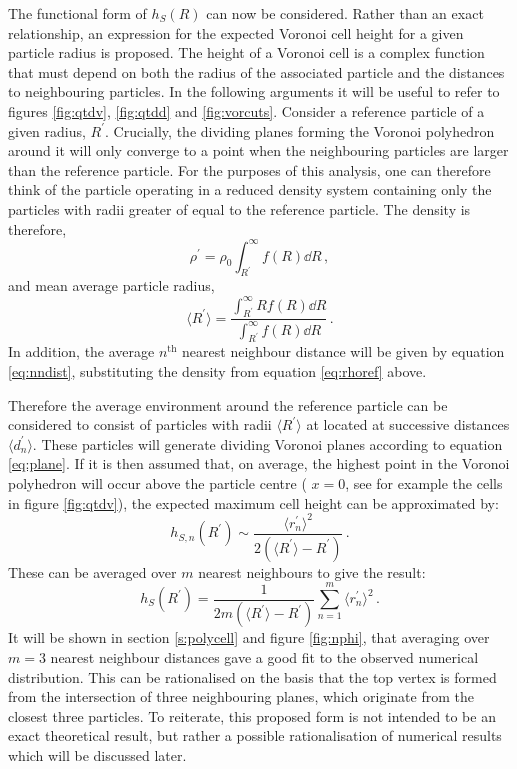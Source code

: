 The functional form of $h_S\left(R\right)$ can now be considered.
Rather than an exact relationship, an expression for the expected Voronoi cell height for a given particle radius is proposed.
The height of a Voronoi cell is a complex function that must depend on both the radius of the associated particle and the distances to neighbouring particles. 
In the following arguments it will be useful to refer to figures \ref{fig:qtdv}, \ref{fig:qtdd} and \ref{fig:vorcuts}.
Consider a reference particle of a given radius, $R^\prime$.
Crucially, the dividing planes forming the Voronoi polyhedron around it will only converge to a point when the neighbouring particles are larger than the reference particle.
For the purposes of this analysis, one can therefore think of the particle operating in a reduced density system containing only the particles with radii greater of equal to the reference particle.
The density is therefore,
\begin{equation}
	\label{eq:rhoref}
	\rho^\prime = \rho_0 \int_{R^\prime}^{\infty} f\left(R\right) \dd R\,,
\end{equation}
and mean average particle radius,
\begin{equation}
	\langle R^\prime \rangle = \frac{\int_{R^\prime}^{\infty} R f\left(R\right) \dd R }{\int_{R^\prime}^{\infty} f\left(R\right) \dd R}\,.
\end{equation}
In addition, the average $n^{\mathrm{th}}$ nearest neighbour distance will be given by equation \eqref{eq:nndist}, substituting the density from equation \eqref{eq:rhoref} above.

Therefore the average environment around the reference particle can be considered to consist of particles with radii $\langle R^\prime \rangle$ at located at successive distances $\langle d^\prime_n\rangle$.
These particles will generate dividing Voronoi planes according to equation \eqref{eq:plane}.
If it is then assumed that, on average, the highest point in the Voronoi polyhedron will occur above the particle centre (\ie{} $x=0$, see for example the cells in figure \ref{fig:qtdv}), the expected maximum cell height can be approximated by:
\begin{equation}
	h_{S,n}\left(R^\prime\right) \sim \frac{\langle r^\prime_n\rangle^2}{2\left(\langle R^\prime \rangle - R^\prime\right)}\,.
\end{equation}
These can be averaged over $m$ nearest neighbours to give the result:
\begin{equation}
	h_S\left(R^\prime\right) = \frac{1}{2m\left(\langle R^\prime\rangle-R^\prime\right)}\sum\limits_{n=1}^{m} \langle r^\prime_n \rangle^2\,.
\end{equation} 
It will be shown in section \ref{s:polycell} and figure \ref{fig:nphi}, that averaging over $m=3$ nearest neighbour distances gave a good fit to the observed numerical distribution.
This can be rationalised on the basis that the top vertex is formed from the intersection of three neighbouring planes, which originate from the closest three particles.
To reiterate, this proposed form is not intended to be an exact theoretical result, but rather a possible rationalisation of numerical results which will be discussed later.

